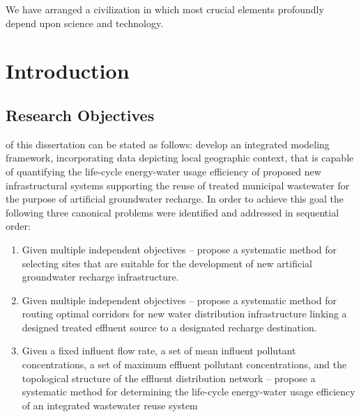\setcounter{page}{1}

\begin{savequote}[75mm]
We have arranged a civilization in which most crucial elements profoundly depend upon science and technology.
\end{savequote}

\chapter{Introduction}
\label{Introduction}

\newpage

\section{Research Objectives}

 of this dissertation can be stated as follows: develop an integrated modeling framework, incorporating data depicting local geographic context, that is capable of quantifying the life-cycle energy-water usage efficiency of proposed new infrastructural systems supporting the reuse of treated municipal wastewater for the purpose of artificial groundwater recharge. In order to achieve this goal the following three canonical problems were identified and addressed in sequential order:

    \begin{enumerate}
         
        \item Given multiple independent objectives -- propose a systematic method for selecting sites that are suitable for the development of new artificial groundwater recharge infrastructure.   
        \item Given multiple independent objectives -- propose a systematic method for routing optimal corridors for new water distribution infrastructure linking a designed treated effluent source to a designated recharge destination.
        \item Given a fixed influent flow rate, a set of mean influent pollutant concentrations, a set of maximum effluent pollutant concentrations, and the topological structure of the effluent distribution network -- propose a systematic method for determining the life-cycle energy-water usage efficiency of an integrated wastewater reuse system 
    
    \end{enumerate}
    
